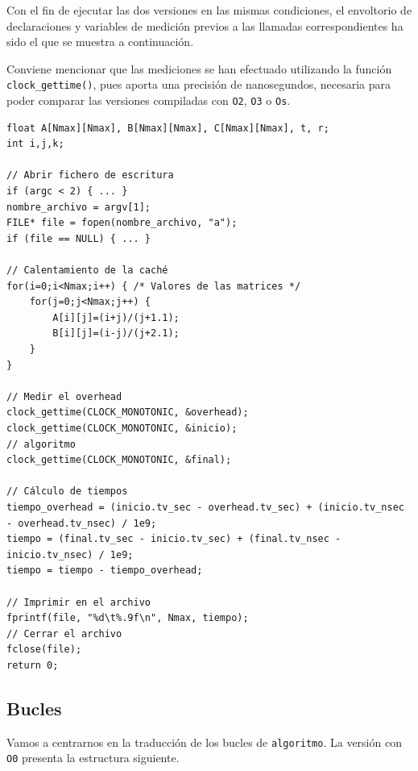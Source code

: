 \documentclass[11pt,a4paper,twoside]{article}
\theoremstyle{definition}
\begin{document}
	Con el fin de ejecutar las dos versiones en las mismas condiciones, el envoltorio de declaraciones y variables de medición previos a las llamadas correspondientes ha sido el que se muestra a continuación.
	
	Conviene mencionar que las mediciones se han efectuado utilizando la función \texttt{clock\_gettime()}, pues aporta una precisión de nanosegundos, necesaria para poder comparar las versiones compiladas con \texttt{O2}, \texttt{O3} o \texttt{Os}.
	
	\begin{verbatim}
float A[Nmax][Nmax], B[Nmax][Nmax], C[Nmax][Nmax], t, r;
int i,j,k;

// Abrir fichero de escritura
if (argc < 2) { ... }
nombre_archivo = argv[1];
FILE* file = fopen(nombre_archivo, "a");
if (file == NULL) { ... }

// Calentamiento de la caché
for(i=0;i<Nmax;i++) { /* Valores de las matrices */
	for(j=0;j<Nmax;j++) {
		A[i][j]=(i+j)/(j+1.1);
		B[i][j]=(i-j)/(j+2.1);
	}
}

// Medir el overhead
clock_gettime(CLOCK_MONOTONIC, &overhead);
clock_gettime(CLOCK_MONOTONIC, &inicio);
// algoritmo
clock_gettime(CLOCK_MONOTONIC, &final);

// Cálculo de tiempos
tiempo_overhead = (inicio.tv_sec - overhead.tv_sec) + (inicio.tv_nsec
- overhead.tv_nsec) / 1e9;
tiempo = (final.tv_sec - inicio.tv_sec) + (final.tv_nsec - inicio.tv_nsec) / 1e9;
tiempo = tiempo - tiempo_overhead;

// Imprimir en el archivo
fprintf(file, "%d\t%.9f\n", Nmax, tiempo);
// Cerrar el archivo
fclose(file);
return 0;
	\end{verbatim}

	\subsection{Bucles}
	
	Vamos a centrarnos en la traducción de los bucles de \texttt{algoritmo}. La versión con \texttt{O0} presenta la estructura siguiente.
	
\end{document}
